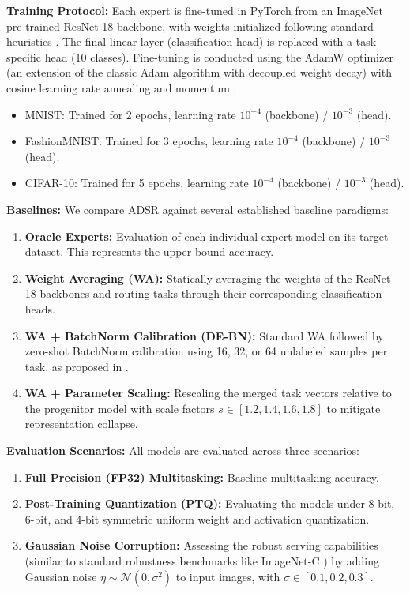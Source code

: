 \documentclass{article}
\theoremstyle{plain}
\theoremstyle{definition}
\theoremstyle{remark}
\begin{document}
\textbf{Training Protocol:} Each expert is fine-tuned in PyTorch \cite{paszke19pytorch} from an ImageNet \cite{deng09imagenet} pre-trained ResNet-18 \cite{he16resnet} backbone, with weights initialized following standard heuristics \cite{glorot10understanding, he15delving}. The final linear layer (classification head) is replaced with a task-specific head (10 classes). Fine-tuning is conducted using the AdamW optimizer \cite{loshchilov17decoupled} (an extension of the classic Adam algorithm \cite{kingma14adam} with decoupled weight decay) with cosine learning rate annealing \cite{loshchilov16sgdr} and momentum \cite{sutskever13importance}:
\begin{itemize}
    \item MNIST: Trained for 2 epochs, learning rate $10^{-4}$ (backbone) / $10^{-3}$ (head).
    \item FashionMNIST: Trained for 3 epochs, learning rate $10^{-4}$ (backbone) / $10^{-3}$ (head).
    \item CIFAR-10: Trained for 5 epochs, learning rate $10^{-4}$ (backbone) / $10^{-3}$ (head).
\end{itemize}

\textbf{Baselines:} We compare ADSR against several established baseline paradigms:
\begin{enumerate}
    \item \textbf{Oracle Experts:} Evaluation of each individual expert model on its target dataset. This represents the upper-bound accuracy.
    \item \textbf{Weight Averaging (WA):} Statically averaging the weights of the ResNet-18 backbones and routing tasks through their corresponding classification heads.
    \item \textbf{WA + BatchNorm Calibration (DE-BN):} Standard WA followed by zero-shot BatchNorm calibration using 16, 32, or 64 unlabeled samples per task, as proposed in \citet{choshen23fusing}.
    \item \textbf{WA + Parameter Scaling:} Rescaling the merged task vectors relative to the progenitor model with scale factors $s \in [1.2, 1.4, 1.6, 1.8]$ to mitigate representation collapse.
\end{enumerate}

\textbf{Evaluation Scenarios:} All models are evaluated across three scenarios:
\begin{enumerate}
    \item \textbf{Full Precision (FP32) Multitasking:} Baseline multitasking accuracy.
    \item \textbf{Post-Training Quantization (PTQ):} Evaluating the models under 8-bit, 6-bit, and 4-bit symmetric uniform weight and activation quantization.
    \item \textbf{Gaussian Noise Corruption:} Assessing the robust serving capabilities (similar to standard robustness benchmarks like ImageNet-C \cite{hendrycks19imagenetc}) by adding Gaussian noise $\eta \sim \mathcal{N}(0, \sigma^2)$ to input images, with $\sigma \in [0.1, 0.2, 0.3]$.
\end{enumerate}
\end{document}
